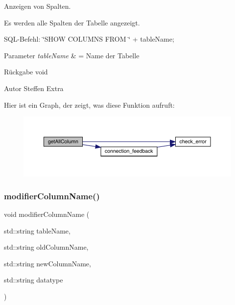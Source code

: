 Anzeigen von Spalten. 

Es werden alle Spalten der Tabelle angezeigt. ~\newline


S\+Q\+L-\/\+Befehl\+: \char`\"{}\+S\+H\+O\+W C\+O\+L\+U\+M\+N\+S F\+R\+O\+M \char`\"{} + table\+Name;


\begin{DoxyParams}{Parameter}
{\em table\+Name} & = Name der Tabelle\\
\hline
\end{DoxyParams}
\begin{DoxyReturn}{Rückgabe}
void
\end{DoxyReturn}
\begin{DoxyAuthor}{Autor}
Steffen Extra 
\end{DoxyAuthor}
Hier ist ein Graph, der zeigt, was diese Funktion aufruft\+:\nopagebreak
\begin{figure}[H]
\begin{center}
\leavevmode
\includegraphics[width=350pt]{tables_8hpp_aceb780082d3f7392e485cac394d6c606_cgraph}
\end{center}
\end{figure}
\mbox{\label{tables_8hpp_a244b10b3b373f8a174943176101a480f}} 
\subsubsection{modifier\+Column\+Name()}
{\footnotesize\ttfamily void modifier\+Column\+Name (\begin{DoxyParamCaption}\item[{std\+::string}]{table\+Name,  }\item[{std\+::string}]{old\+Column\+Name,  }\item[{std\+::string}]{new\+Column\+Name,  }\item[{std\+::string}]{datatype }\end{DoxyParamCaption})}



